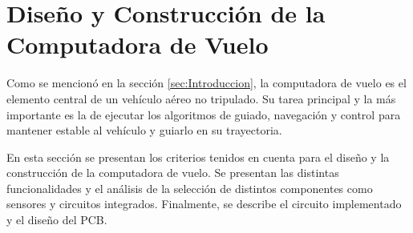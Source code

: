 \section{Diseño y Construcción de la Computadora de Vuelo}



Como se mencionó en la sección \ref{sec:Introduccion}, la computadora de vuelo es el elemento central de un vehículo aéreo no tripulado. Su tarea principal y la más importante es la de ejecutar los algoritmos de guiado, navegación y control para mantener estable al vehículo y guiarlo en su trayectoria.

En esta sección se presentan los criterios tenidos en cuenta para el diseño y la construcción de la computadora de vuelo. Se presentan las distintas funcionalidades y el análisis de la selección de distintos componentes como sensores y circuitos integrados. Finalmente, se describe el circuito implementado y el diseño del PCB.







